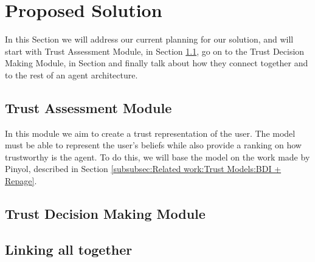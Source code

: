 \section{Proposed Solution}
\label{sec:Solution}
In this Section we will address our current planning for our solution, and will start with Trust Assessment Module, in Section \ref{subsec:Solution:Trust Assessment Module}, go on to the Trust Decision Making Module, in Section and finally talk about how they connect together and to the rest of an agent architecture.


\subsection{Trust Assessment Module}
\label{subsec:Solution:Trust Assessment Module}
In this module we aim to create a trust representation of the user. The model must be able to represent the user's beliefs while also provide a ranking on how trustworthy is the agent. To do this, we will base the model on the work made by Pinyol\cite{Pinyol2009}, described in Section \ref{subsubsec:Related work:Trust Models:BDI + Repage}.



\subsection{Trust Decision Making Module}
\label{subsec:Solution:Trust Decision Making Module}

\subsection{Linking all together}
\label{subsec:Solution:Linking all together}